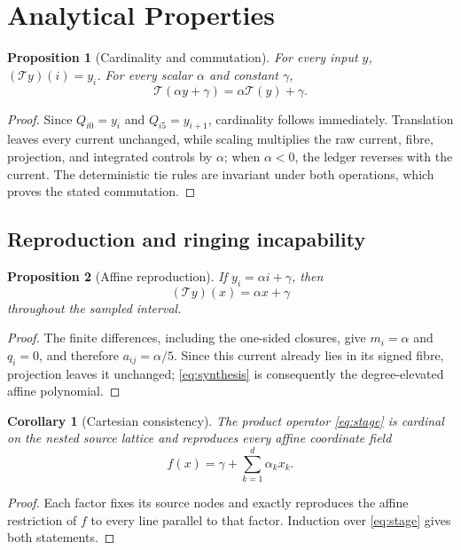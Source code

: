 \documentclass[journal]{IEEEtran}
\newtheorem{proposition}{Proposition}
\newtheorem{corollary}{Corollary}
\newcommand{\Tcal}{\mathcal{T}}
\begin{document}
\section{Analytical Properties}

\begin{proposition}[Cardinality and commutation]
For every input \(y\), \((\Tcal y)(i)=y_i\). For every scalar
\(\alpha\) and constant \(\gamma\),
\[
 \Tcal(\alpha y+\gamma)=\alpha\Tcal(y)+\gamma.
\]
\end{proposition}

\begin{proof}
Since \(Q_{i0}=y_i\) and \(Q_{i5}=y_{i+1}\), cardinality follows
immediately. Translation leaves every current unchanged, while scaling
multiplies the raw current, fibre, projection, and integrated controls by
\(\alpha\); when \(\alpha<0\), the ledger reverses with the current. The
deterministic tie rules are invariant under both operations, which proves the
stated commutation.
\end{proof}

\subsection{Reproduction and ringing incapability}

\begin{proposition}[Affine reproduction]
If \(y_i=\alpha i+\gamma\), then
\[
  (\Tcal y)(x)=\alpha x+\gamma
\]
throughout the sampled interval.
\end{proposition}

\begin{proof}
The finite differences, including the one-sided closures, give
\(m_i=\alpha\) and \(q_i=0\), and therefore
\(a_{ij}=\alpha/5\). Since this current already lies in its signed fibre,
projection leaves it unchanged; \eqref{eq:synthesis} is consequently the
degree-elevated affine polynomial.
\end{proof}

\begin{corollary}[Cartesian consistency]
The product operator \eqref{eq:stage} is cardinal on the nested source
lattice and reproduces every affine coordinate field
\[
 f(x)=\gamma+\sum_{k=1}^d\alpha_kx_k.
\]
\end{corollary}

\begin{proof}
Each factor fixes its source nodes and exactly reproduces the affine
restriction of \(f\) to every line parallel to that factor. Induction over
\eqref{eq:stage} gives both statements.
\end{proof}
\end{document}
